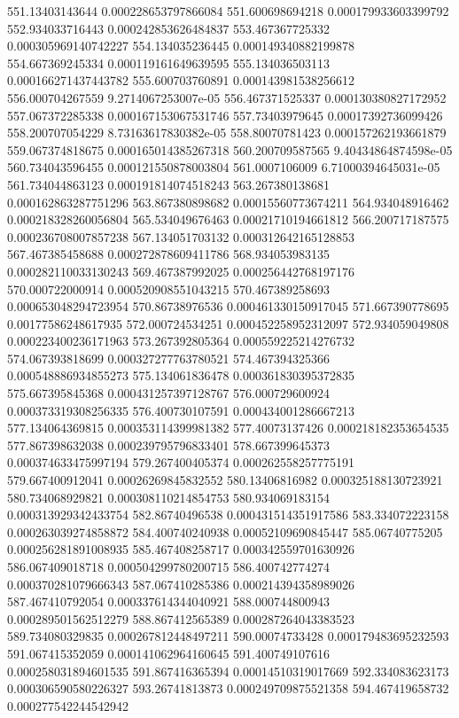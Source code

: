 {551.13403143644 0.000228653797866084
551.600698694218 0.000179933603399792
552.934033716443 0.000242853626484837
553.467367725332 0.000305969140742227
554.134035236445 0.000149340882199878
554.667369245334 0.000119161649639595
555.134036503113 0.000166271437443782
555.600703760891 0.000143981538256612
556.000704267559 9.2714067253007e-05
556.467371525337 0.000130380827172952
557.067372285338 0.000167153067531746
557.73403979645 0.00017392736099426
558.200707054229 8.73163617830382e-05
558.80070781423 0.000157262193661879
559.067374818675 0.000165014385267318
560.200709587565 9.40434864874598e-05
560.734043596455 0.000121550878003804
561.0007106009 6.71000394645031e-05
561.734044863123 0.000191814074518243
563.267380138681 0.000162863287751296
563.867380898682 0.00015560773674211
564.934048916462 0.000218328260056804
565.534049676463 0.00021710194661812
566.200717187575 0.000236708007857238
567.134051703132 0.000312642165128853
567.467385458688 0.000272878609411786
568.934053983135 0.000282110033130243
569.467387992025 0.000256442768197176
570.000722000914 0.000520908551043215
570.467389258693 0.000653048294723954
570.86738976536 0.000461330150917045
571.667390778695 0.00177586248617935
572.000724534251 0.000452258952312097
572.934059049808 0.000223400236171963
573.267392805364 0.000559225214276732
574.067393818699 0.000327277763780521
574.467394325366 0.000548886934855273
575.134061836478 0.000361830395372835
575.667395845368 0.000431257397128767
576.000729600924 0.000373319308256335
576.400730107591 0.000434001286667213
577.134064369815 0.000353114399981382
577.40073137426 0.000218182353654535
577.867398632038 0.000239795796833401
578.667399645373 0.000374633475997194
579.267400405374 0.000262558257775191
579.667400912041 0.00026269845832552
580.13406816982 0.000325188130723921
580.734068929821 0.000308110214854753
580.934069183154 0.000313929342433754
582.86740496538 0.000431514351917586
583.334072223158 0.000263039274858872
584.400740240938 0.00052109690845447
585.06740775205 0.000256281891008935
585.467408258717 0.000342559701630926
586.067409018718 0.000504299780200715
586.400742774274 0.000370281079666343
587.067410285386 0.000214394358989026
587.467410792054 0.000337614344040921
588.000744800943 0.000289501562512279
588.867412565389 0.000287264043383523
589.734080329835 0.000267812448497211
590.00074733428 0.000179483695232593
591.067415352059 0.000141062964160645
591.400749107616 0.000258031894601535
591.867416365394 0.00014510319017669
592.334083623173 0.000306590580226327
593.26741813873 0.000249709875521358
594.467419658732 0.000277542244542942
}
